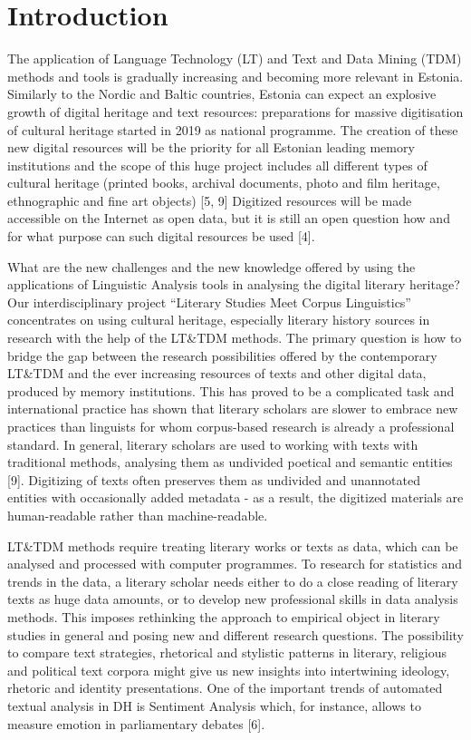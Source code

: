\documentclass[runningheads]{llncs}
\begin{document}
\section{Introduction}

The application of Language Technology (LT) and Text and Data Mining (TDM) methods and tools is gradually increasing and becoming more relevant in Estonia. Similarly to the Nordic and Baltic countries, Estonia can expect an explosive growth of digital heritage and text resources: preparations for massive digitisation of cultural heritage started in 2019 as national programme. The creation of these new digital resources will be the priority for all Estonian leading memory institutions and the scope of this huge project includes all different types of cultural heritage (printed books, archival documents, photo and film heritage, ethnographic and fine art objects) [5, 9] Digitized resources will be made accessible on the Internet as open data, but it is still an open question how and for what purpose can such digital resources be used [4]. 

What are the new challenges and the new knowledge offered by using the applications of Linguistic Analysis tools in analysing the digital literary heritage? Our interdisciplinary project “Literary Studies Meet Corpus Linguistics” concentrates on using cultural heritage, especially literary history sources in research with the help of the LT\&TDM methods. The primary question is how to bridge the gap between the research possibilities offered by the contemporary LT\&TDM and the ever increasing resources of texts and other digital data, produced by memory institutions. This has proved to be a complicated task and international practice has shown that literary scholars are slower to embrace new practices than linguists for whom corpus-based research is already a professional standard. In general, literary scholars are used to working with texts with traditional methods, analysing them as undivided poetical and semantic entities [9]. Digitizing of texts often preserves them as undivided and unannotated entities with occasionally added metadata - as a result, the digitized materials are human-readable rather than machine-readable.

LT\&TDM methods require treating literary works or texts as data, which can be analysed and processed with computer programmes. To research for statistics and trends in the data, a literary scholar needs either to do a close reading of literary texts as huge data amounts, or to develop new professional skills in data analysis methods. This imposes rethinking the approach to empirical object in literary studies in general and posing new and different research questions. The possibility to compare text strategies, rhetorical and stylistic patterns in literary, religious and political text corpora might give us new insights into intertwining ideology, rhetoric and identity presentations. One of the important trends of automated textual analysis in DH is Sentiment Analysis which, for instance, allows to measure emotion in parliamentary debates [6].
\end{document}
